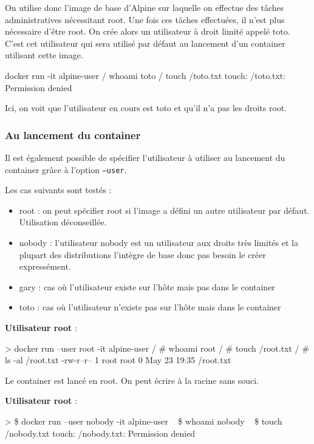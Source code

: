 \documentclass[11pt,a4paper,oneside]{report}
\newcommand{\code}[1]{\texttt{#1}}
\begin{document}
On utilise donc l'image de base d'Alpine sur laquelle on effectue des tâches administratives nécessitant root. Une fois ces tâches effectuées, il n'est plus nécessaire d'être root. On crée alors un utilisateur à droit limité appelé toto. C'est cet utilisateur qui sera utilisé par défaut au lancement d'un container utilisant cette image.

\begin{textcode}
docker run -it alpine-user
/ whoami
toto
/ touch /toto.txt
touch: /toto.txt: Permission denied
\end{textcode}

Ici, on voit que l'utilisateur en cours est toto et qu'il n'a pas les droits root.

\subsubsection{Au lancement du container}
Il est également possible de spécifier l'utilisateur à utiliser au lancement du container grâce à l'option \code{--user}.

Les cas suivants sont testés :
\begin{itemize}
\item root : on peut spécifier root si l'image a défini un autre utilisateur par défaut. Utilisation déconseillée.
\item nobody : l'utilisateur nobody est un utilisateur aux droits très limités et la plupart des distributions l'intègre de base donc pas besoin le créer expressément.
\item gary : cas où l'utilisateur existe sur l'hôte mais pas dans le container
\item toto : cas où l'utilisateur n'existe pas sur l'hôte mais dans le container
\end{itemize}

\textbf{Utilisateur root} :
\begin{textcode}
> docker run --user root -it alpine-user
/ # whoami
root
/ # touch /root.txt
/ # ls -al /root.txt
-rw-r--r--    1 root     root             0 May 23 19:35 /root.txt
\end{textcode}

Le container est lancé en root. On peut écrire à la racine sans souci.

\textbf{Utilisateur root} :
\begin{textcode}
> \$ docker run --user nobody -it alpine-user
~ \$ whoami
nobody
~ \$ touch /nobody.txt
touch: /nobody.txt: Permission denied

\end{textcode}
\end{document}
